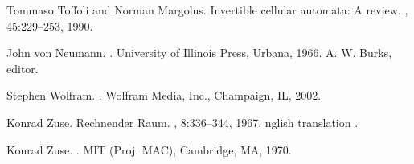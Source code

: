 \documentclass{article}
\theoremstyle{definition}
\begin{document}
\begin{thebibliography}{Mur89}
Tommaso Toffoli and Norman Margolus.
\newblock Invertible cellular automata: A review.
, 45:229--253, 1990.

John von Neumann.
.
\newblock University of Illinois Press, Urbana, 1966.
\newblock A. W. Burks, editor.

Stephen Wolfram.
.
\newblock Wolfram Media, Inc., Champaign, IL, 2002.

Konrad Zuse.
\newblock Rechnender {Raum}.
, 8:336--344, 1967.
nglish translation \cite{zuse-70}.

Konrad Zuse.
.
\newblock MIT (Proj. MAC), Cambridge, MA, 1970.

\end{thebibliography}
\end{document}
